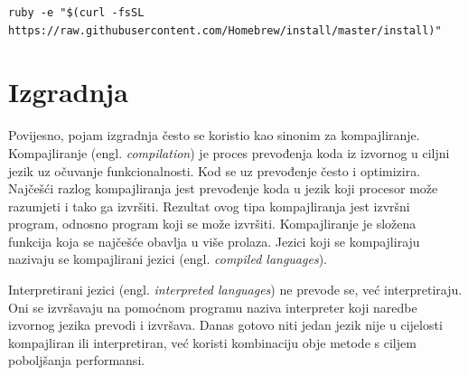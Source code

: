 \documentclass[times, utf8, diplomski, numeric]{fer}
\newcommand{\eng}[1]{(engl. \textit{#1})}
\begin{document}
\begin{lstlisting}[caption=Instalacija Homebrew alata, label=listing:homebrew]
ruby -e "$(curl -fsSL https://raw.githubusercontent.com/Homebrew/install/master/install)"
\end{lstlisting}

\section{Izgradnja} \label{header:Izgradnja}

Povijesno, pojam izgradnja često se koristio kao sinonim za kompajliranje. Kompajliranje \eng{compilation} je proces prevođenja koda iz izvornog u ciljni jezik uz očuvanje funkcionalnosti. Kod se uz prevođenje često i optimizira. Najčešći razlog kompajliranja jest prevođenje koda u jezik koji procesor može razumjeti i tako ga izvršiti. Rezultat ovog tipa kompajliranja jest izvršni program, odnosno program koji se može izvršiti. Kompajliranje je složena funkcija koja se najčešće obavlja u više prolaza. Jezici koji se kompajliraju nazivaju se kompajlirani jezici \eng{compiled languages}.

Interpretirani jezici \eng{interpreted languages} ne prevode se, već interpretiraju. Oni se izvršavaju na pomoćnom programu naziva interpreter koji naredbe izvornog jezika prevodi i izvršava. Danas gotovo niti jedan jezik nije u cijelosti kompajliran ili interpretiran, već koristi kombinaciju obje metode s ciljem poboljšanja performansi.
\end{document}
